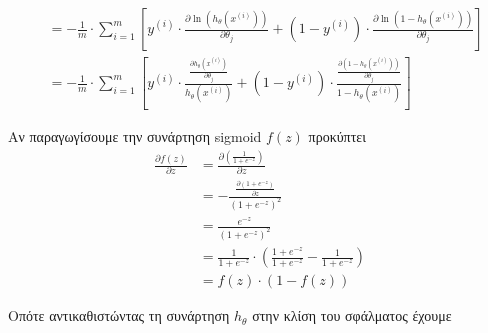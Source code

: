 \documentclass{article}
\begin{document}
\pagebreak

	\begin{align*}
		&= -\frac{1}{m} \cdot \sum_{i=1}^{m} \left[ y^{(i)} \cdot \frac{ \partial \ln( h_{θ}(x^{(i)}) )}{\partial θ_{j}} + 
		(1 - y^{(i)}) \cdot \frac{ \partial \ln (1 - h_{θ}(x^{(i)}))}{\partial θ_{j}} \right]\\
		&= -\frac{1}{m} \cdot \sum_{i=1}^{m} \left[ y^{(i)} \cdot \frac{ \frac{\partial h_{θ}(x^{(i)})}{\partial θ_{j}}}{h_{θ}(x^{(i)})} + 
		(1 - y^{(i)}) \cdot \frac{ \frac{\partial (1 - h_{θ}(x^{(i)}))}{\partial θ_{j}}}{1 - h_{θ}(x^{(i)})} \right]
	\end{align*}


	\noindent
	Aν παραγωγίσουμε την συνάρτηση sigmoid $f(z)$ προκύπτει
	\begin{align*}
		\frac{\partial f(z)}{\partial z} &= \frac{ \partial \left( \frac{1}{1 + e^{-z}} \right) }{\partial z} \\
										 &= -\frac{\frac{ \partial ( {1 + e^{-z}} ) }{\partial z}}{(1 + e^{-z})^2} \\
										 &= \frac{e^{-z}}{(1 + e^{-z})^2} \\
										 &= \frac{1}{1 + e^{-z}} \cdot \left( \frac{1 + e^{-z}}{1 + e^{-z}} - \frac{1}{1 + e^{-z}}\right)\\
										 &= f(z) \cdot (1 - f(z))  
	\end{align*}


	\noindent
	Οπότε αντικαθιστώντας τη συνάρτηση $h_θ$ στην κλίση του σφάλματος έχουμε
	
\end{document}
